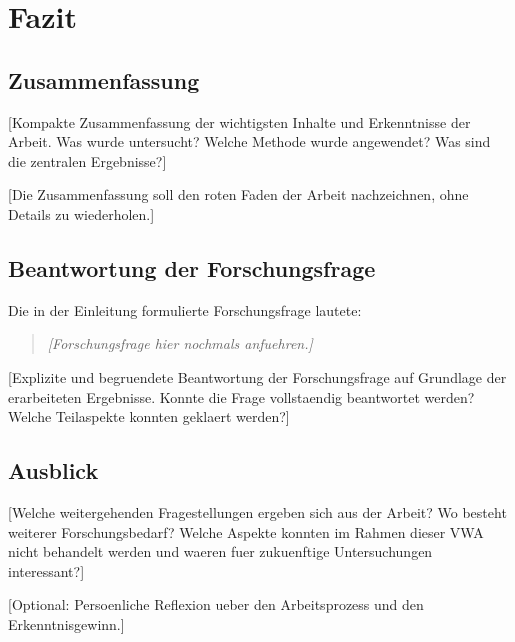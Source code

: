 
\chapter{Fazit}
\label{chap:fazit}



\section{Zusammenfassung}
\label{sec:zusammenfassung}

[Kompakte Zusammenfassung der wichtigsten Inhalte und Erkenntnisse
der Arbeit. Was wurde untersucht? Welche Methode wurde angewendet?
Was sind die zentralen Ergebnisse?]

[Die Zusammenfassung soll den roten Faden der Arbeit nachzeichnen,
ohne Details zu wiederholen.]


\section{Beantwortung der Forschungsfrage}
\label{sec:beantwortung}

Die in der Einleitung formulierte Forschungsfrage lautete:

\begin{quote}
\textit{[Forschungsfrage hier nochmals anfuehren.]}
\end{quote}

[Explizite und begruendete Beantwortung der Forschungsfrage auf
Grundlage der erarbeiteten Ergebnisse. Konnte die Frage vollstaendig
beantwortet werden? Welche Teilaspekte konnten geklaert werden?]


\section{Ausblick}
\label{sec:ausblick}

[Welche weitergehenden Fragestellungen ergeben sich aus der Arbeit?
Wo besteht weiterer Forschungsbedarf? Welche Aspekte konnten im
Rahmen dieser VWA nicht behandelt werden und waeren fuer zukuenftige
Untersuchungen interessant?]

[Optional: Persoenliche Reflexion ueber den Arbeitsprozess und
den Erkenntnisgewinn.]
